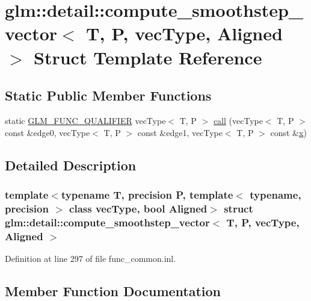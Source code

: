 \hypertarget{structglm_1_1detail_1_1compute__smoothstep__vector}{}\section{glm\+::detail\+::compute\+\_\+smoothstep\+\_\+vector$<$ T, P, vec\+Type, Aligned $>$ Struct Template Reference}
\label{structglm_1_1detail_1_1compute__smoothstep__vector}
\subsection*{Static Public Member Functions}
\begin{DoxyCompactItemize}
\item 
static \mbox{\hyperlink{setup_8hpp_a33fdea6f91c5f834105f7415e2a64407}{G\+L\+M\+\_\+\+F\+U\+N\+C\+\_\+\+Q\+U\+A\+L\+I\+F\+I\+ER}} vec\+Type$<$ T, P $>$ \mbox{\hyperlink{structglm_1_1detail_1_1compute__smoothstep__vector_a73d7edc2631135b93a5855f4804b524e}{call}} (vec\+Type$<$ T, P $>$ const \&edge0, vec\+Type$<$ T, P $>$ const \&edge1, vec\+Type$<$ T, P $>$ const \&\mbox{\hyperlink{glad_8h_a92d0386e5c19fb81ea88c9f99644ab1d}{x}})
\end{DoxyCompactItemize}


\subsection{Detailed Description}
\subsubsection*{template$<$typename T, precision P, template$<$ typename, precision $>$ class vec\+Type, bool Aligned$>$\newline
struct glm\+::detail\+::compute\+\_\+smoothstep\+\_\+vector$<$ T, P, vec\+Type, Aligned $>$}



Definition at line 297 of file func\+\_\+common.\+inl.



\subsection{Member Function Documentation}
\mbox{\label{structglm_1_1detail_1_1compute__smoothstep__vector_a73d7edc2631135b93a5855f4804b524e}} 
